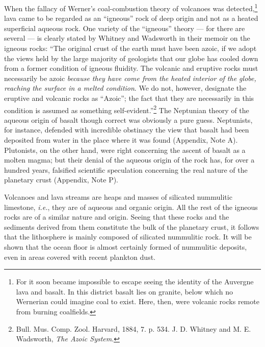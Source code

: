 \documentclass[a4paper, 12pt, oneside]{article}
\begin{document}
When the fallacy of Werner's coal-combustion theory of volcanoes was detected,\footnote{For it soon became impossible to escape seeing the identity of the Auvergne lava and basalt. In this district basalt lies on granite, below which no Wernerian could imagine coal to exist. Here, then, were volcanic rocks remote from burning coalfields.} lava came to be regarded as an ``igneous'' rock of deep origin and not as a heated superficial aqueous rock. One variety of the ``igneous'' theory --- for there are several --- is clearly stated by Whitney and Wadsworth in their memoir on the igneous rocks: ``The original crust of the earth must have been azoic, if we adopt the views held by the large majority of geologists that our globe has cooled down from a former condition of igneous fluidity. The volcanic and eruptive rocks must necessarily be azoic \emph{because they have come from the heated interior of the globe, reaching the surface in a melted condition}. We do not, however, designate the eruptive and volcanic rocks as ``Azoic''; the fact that they are necessarily in this condition is assumed as something self-evident.''\footnote{Bull. Mus. Comp. Zool. Harvard, 1884, 7. p. 534. J. D. Whitney and M. E. Wadsworth, \emph{The Azoic System}.} The Neptunian theory of the aqueous origin of basalt though correct was obviously a pure guess. Neptunists, for instance, defended with incredible obstinacy the view that basalt had been deposited from water in the place where it was found (Appendix, Note A). Plutonists, on the other hand, were right concerning the ascent of basalt as a molten magma; but their denial of the aqueous origin of the rock has, for over a hundred years, falsified scientific speculation concerning the real nature of the planetary crust (Appendix, Note P).

Volcanoes and lava streams are heaps and masses of silicated nummulitic limestone, \emph{i.e.}, they are of aqueous and organic origin. All the rest of the igneous rocks are of a similar nature and origin. Seeing that these rocks and the sediments derived from them constitute the bulk of the planetary crust, it follows that the lithosphere is mainly composed of silicated nummulitic rock. It will be shown that the ocean floor is almost certainly formed of nummulitic deposits, even in areas covered with recent plankton dust.
\end{document}
